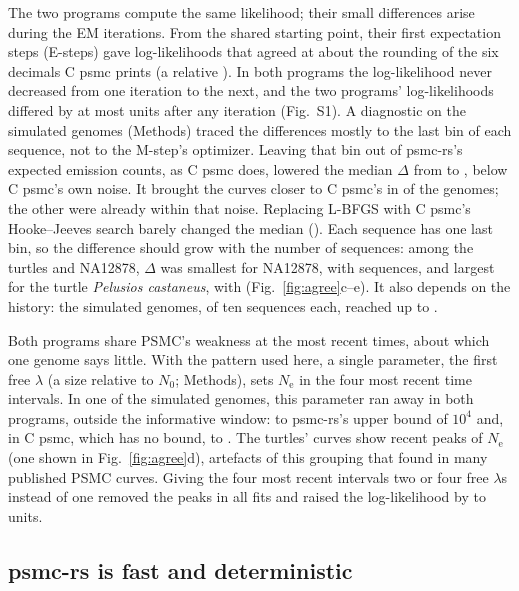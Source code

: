 \documentclass[11pt]{article}
\newcommand{\psmcrs}{psmc-rs}
\newcommand{\Ne}{\ensuremath{N_\mathrm{e}}}
\begin{document}
The two programs compute the same likelihood; their small differences arise during the EM iterations. From the shared starting point, their first expectation steps (E-steps) gave log-likelihoods that agreed at about the rounding of the six decimals C psmc prints (a relative \EoneLoglikeFirstRelMax{}). In both programs the log-likelihood never decreased from one iteration to the next, and the two programs' log-likelihoods differed by at most \EoneSoneDiffMax{} units after any iteration (Fig.~S1). A diagnostic on the simulated genomes (Methods) traced the differences mostly to the last bin of each sequence, not to the M-step's optimizer. Leaving that bin out of \psmcrs{}'s expected emission counts, as C psmc does, lowered the median $\Delta$ from \DiagMedianDefault{} to \DiagMedianLastBin{}, below C psmc's own noise. It brought the curves closer to C psmc's in \DiagLastBinCloser{} of the \EoneGenomes{} genomes; the other \DiagLastBinOtherW{} were already within that noise. Replacing L-BFGS with C psmc's Hooke--Jeeves search barely changed the median (\DiagMedianHookeJeeves{}). Each sequence has one last bin, so the difference should grow with the number of sequences: among the turtles and NA12878, $\Delta$ was smallest for NA12878, with \EtwoHumanSequences{} sequences, and largest for the turtle \textit{Pelusios castaneus}, with \EtwoTurtleSeqMax{} (Fig.~\ref{fig:agree}c--e). It also depends on the history: the simulated genomes, of ten sequences each, reached up to \EoneRsCRmseMax{}.

Both programs share PSMC's weakness at the most recent times, about which one genome says little. With the pattern used here, a single parameter, the first free $\lambda$ (a size relative to $N_0$; Methods), sets \Ne{} in the four most recent time intervals. In one of the \EoneGenomes{} simulated genomes, this parameter ran away in both programs, outside the informative window: to \psmcrs{}'s upper bound of $10^4$ and, in C psmc, which has no bound, to \EoneRunawayC{}. The turtles' curves show recent peaks of \Ne{} (one shown in Fig.~\ref{fig:agree}d), artefacts of this grouping that \citet{hilgers2025} found in many published PSMC curves. Giving the four most recent intervals two or four free $\lambda$s instead of one removed the peaks in all \EtwoSplitFitsW{} fits and raised the log-likelihood by \EtwoSplitGainMin{} to \EtwoSplitGainMax{} units.

\subsection*{\psmcrs{} is fast and deterministic}
\end{document}

